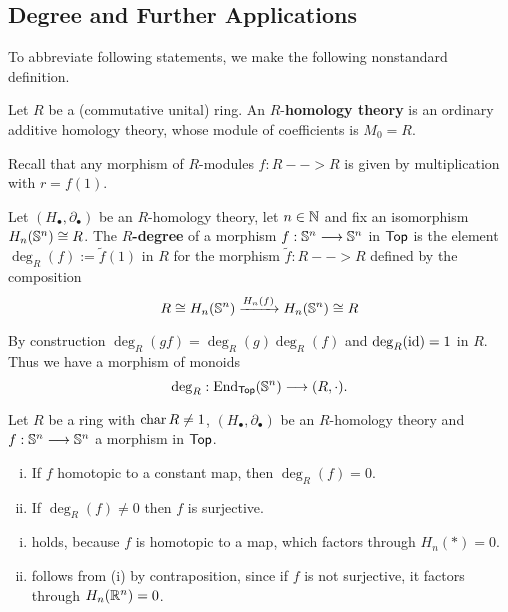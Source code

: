 	\begin{lemma}
	\end{lemma}

	\newpage
	\subsection{Degree and Further Applications}

	To abbreviate following statements, we make the following nonstandard definition.

	\begin{definition}
		Let $R$ be a (commutative unital) ring. An $R$-\textbf{homology theory} is an ordinary additive homology theory, whose module of coefficients is $M_0 = R$.
	\end{definition}

	Recall that any morphism of $R$-modules $f:R --> R$ is given by multiplication with $r = f(1)$.

	\begin{definition}
		Let $(H_\bullet,\partial_\bullet)$ be an $R$-homology theory, let $n \in \N$ and fix an isomorphism $H_n(\S^n) \isom R$. The \textbf{$R$-degree} of a morphism $f:\S^n --> \S^n$ in $\ncat{Top}$ is the element $\deg_R(f) := \tilde{f}(1)$ in $R$ for the morphism $\tilde f:R-->R$ defined by the composition
		\begin{equation*}
			R \isom H_n(\S^n) \xrightarrow{H_n(f)} {H}_n(\S^n)\isom R
		\end{equation*}

		By construction $\deg_R(gf) = \deg_R(g)\deg_R(f)$ and $\deg_R(\id) = 1$ in $R$. Thus we have a morphism of monoids
		\begin{equation*}
			\deg_R: \End_\ncat{Top}(\S^n) \longrightarrow (R,\cdot).
		\end{equation*}
	\end{definition}

	\begin{lemma}[Degree 0]
		Let $R$ be a ring with $\characteristic R \neq 1$, $(H_\bullet, \partial_\bullet)$ be an $R$-homology theory and $f:\S^n --> \S^n$ a morphism in $\ncat{Top}$.
		\begin{enumerate}[(i)]
			\item{
				If $f$ homotopic to a constant map, then $\deg_R(f) = 0$. 
			}
			\item{
				If $\deg_R(f) \neq 0$ then $f$ is surjective.
			}
		\end{enumerate}
	\end{lemma}
	\begin{sketch}
		\begin{enumerate}[(i)]
			\item{
				holds, because $f$ is homotopic to a map, which factors through $H_n(*) = 0$.
			}
			\item{
				follows from (i) by contraposition, since if $f$ is not surjective, it factors through $H_n(\R^n) = 0$.
			}\vspace{-1.5em}
		\end{enumerate}
	\end{sketch}

